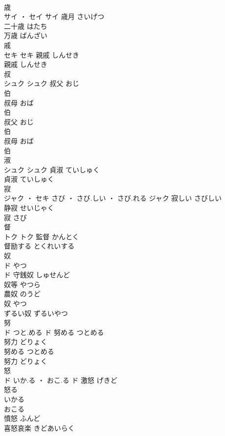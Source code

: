 \documentclass[8pt]{extreport}
\begin{document}
\begin{CJK}{UTF8}{min}
\\	歳	
\\	サイ ・ セイ		サイ	歳月	さいげつ	
\\	二十歳	はたち	
\\	万歳	ばんざい	
\\	戚	
\\	セキ		セキ	親戚	しんせき	
\\	親戚	しんせき	
\\	叔	
\\	シュク		シュク	叔父	おじ	
\\	伯 
\\	叔母	おば	
\\	伯 
\\	叔父	おじ	
\\	伯 
\\	叔母	おば	
\\	伯 
\\	淑	
\\	シュク		シュク	貞淑	ていしゅく	
\\	貞淑	ていしゅく	
\\	寂	
\\	ジャク ・ セキ	さび ・ さび.しい ・ さび.れる	ジャク	寂しい	さびしい	
\\	静寂	せいじゃく	
\\	寂	さび	
\\	督	
\\	トク		トク	監督	かんとく	
\\	督励する	とくれいする	
\\	奴	
\\	ド	やつ
\\	ド	守銭奴	しゅせんど	
\\	奴等	やつら	
\\	農奴	のうど	
\\	奴	やつ	
\\	ずるい奴	ずるいやつ	
\\	努	
\\	ド	つと.める	ド	努める	つとめる	
\\	努力	どりょく	
\\	努める	つとめる	
\\	努力	どりょく	
\\	怒	
\\	ド	いか.る ・ おこ.る	ド	激怒	げきど	
\\	怒る 
\\	いかる 
\\	おこる	
\\	憤怒	ふんど	
\\	喜怒哀楽	きどあいらく	

\end{CJK}
\end{document}
